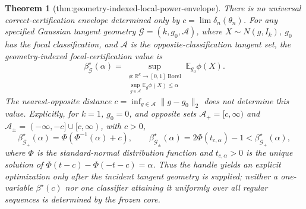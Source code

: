 \documentclass{article}
\newtheorem{theorem}{Theorem}
\begin{document}
\begin{theorem}[thm:geometry-indexed-local-power-envelope]\label{thm:geometry-indexed-local-power-envelope}
There is no universal correct-certification envelope determined only by \(c=\lim\delta_n(\theta_n)\).  For any specified Gaussian tangent geometry \(\mathcal G=(k,g_0,\mathcal A)\), where \(X\sim N(g,I_k)\), \(g_0\) has the focal classification, and \(\mathcal A\) is the opposite-classification tangent set, the geometry-indexed focal-certification value is
\[
 \beta^{\star}_{\mathcal G}(\alpha)
 =\sup_{\substack{\phi:\mathbb R^k\to[0,1]\ \mathrm{Borel}\\
                    \sup_{g\in\mathcal A}\mathbb E_g\phi(X)\le\alpha}}
   \mathbb E_{g_0}\phi(X).
\]
The nearest-opposite distance \(c=\inf_{g\in\mathcal A}\lVert g-g_0\rVert_2\) does not determine this value.  Explicitly, for \(k=1\), \(g_0=0\), and opposite sets \(\mathcal A_+=[c,\infty)\) and \(\mathcal A_{\pm}=(-\infty,-c]\cup[c,\infty)\), with \(c>0\),
\[
 \beta^{\star}_{\mathcal G_+}(\alpha)=\Phi(\Phi^{-1}(\alpha)+c),
 \qquad
 \beta^{\star}_{\mathcal G_{\pm}}(\alpha)=2\Phi(t_{c,\alpha})-1
 <\beta^{\star}_{\mathcal G_+}(\alpha),
\]
where \(\Phi\) is the standard-normal distribution function and \(t_{c,\alpha}>0\) is the unique solution of \(\Phi(t-c)-\Phi(-t-c)=\alpha\).  Thus the handle yields an explicit optimization only after the incident tangent geometry is supplied; neither a one-variable \(\beta^{\star}(c)\) nor one classifier attaining it uniformly over all regular sequences is determined by the frozen core.
\end{theorem}
\end{document}
